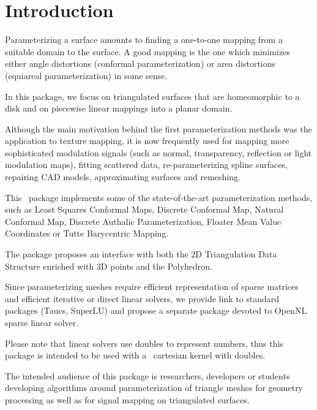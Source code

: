 \section{Introduction}

Parameterizing a surface amounts to finding a one-to-one mapping from
a suitable domain to the surface. A good mapping is the one which
minimizes either angle distortions (conformal parameterization) or
area distortions (equiareal parameterization) in some sense.

In this package, we focus on triangulated surfaces that are homeomorphic to a
disk and on piecewise linear mappings into a planar domain.

Although
the main motivation behind the first parameterization methods was the
application to texture mapping, it is now frequently used for mapping
more sophisticated modulation signals (such as normal, transparency,
reflection or light modulation maps), fitting scattered data,
re-parameterizing spline surfaces, repairing CAD models, approximating
surfaces and remeshing.

This \cgal\ package implements some of
the state-of-the-art parameterization methods, such as
Least Squares Conformal Maps, Discrete Conformal Map, Natural Conformal Map,
Discrete Authalic Parameterization, Floater Mean Value Coordinates or
Tutte Barycentric Mapping.

The package proposes
an interface with both the 2D Triangulation Data Structure enriched
with 3D points and the Polyhedron.

Since parameterizing meshes require
efficient representation of sparse matrices and efficient iterative or
direct linear solvers, we provide link to standard packages ({\sc Taucs}, SuperLU)
and propose a separate package devoted to OpenNL sparse linear solver.

Please note that linear solvers use doubles to represent numbers, thus this
package is intended to be used with a \cgal\ cartesian kernel with doubles.

The intended audience of this package is researchers, developers or
students developing algorithms around parameterization of triangle
meshes for geometry processing as well as for signal mapping on
triangulated surfaces.

